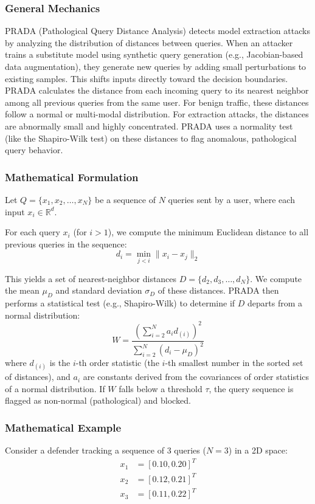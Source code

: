 \documentclass{article}
\begin{document}
\subsubsection{General Mechanics}
PRADA (Pathological Query Distance Analysis) detects model extraction attacks by analyzing the distribution of distances between queries. 
When an attacker trains a substitute model using synthetic query generation (e.g., Jacobian-based data augmentation), they generate new queries by adding small perturbations to existing samples. This shifts inputs directly toward the decision boundaries.
PRADA calculates the distance from each incoming query to its nearest neighbor among all previous queries from the same user. For benign traffic, these distances follow a normal or multi-modal distribution. For extraction attacks, the distances are abnormally small and highly concentrated. PRADA uses a normality test (like the Shapiro-Wilk test) on these distances to flag anomalous, pathological query behavior.

\subsubsection{Mathematical Formulation}
Let $Q = \{x_1, x_2, \dots, x_N\}$ be a sequence of $N$ queries sent by a user, where each input $x_i \in \mathbb{R}^d$. 

For each query $x_i$ (for $i > 1$), we compute the minimum Euclidean distance to all previous queries in the sequence:
\begin{equation}
    d_i = \min_{j < i} \|x_i - x_j\|_2
\end{equation}

This yields a set of nearest-neighbor distances $D = \{d_2, d_3, \dots, d_N\}$. We compute the mean $\mu_D$ and standard deviation $\sigma_D$ of these distances. PRADA then performs a statistical test (e.g., Shapiro-Wilk) to determine if $D$ departs from a normal distribution:
\begin{equation}
    W = \frac{\left( \sum_{i=2}^N a_i d_{(i)} \right)^2}{\sum_{i=2}^N (d_i - \mu_D)^2}
\end{equation}
where $d_{(i)}$ is the $i$-th order statistic (the $i$-th smallest number in the sorted set of distances), and $a_i$ are constants derived from the covariances of order statistics of a normal distribution. If $W$ falls below a threshold $\tau$, the query sequence is flagged as non-normal (pathological) and blocked.

\subsubsection{Mathematical Example}
Consider a defender tracking a sequence of 3 queries ($N=3$) in a 2D space:
\begin{align*}
    x_1 &= [0.10, 0.20]^T \\
    x_2 &= [0.12, 0.21]^T \\
    x_3 &= [0.11, 0.22]^T
\end{align*}
\end{document}
